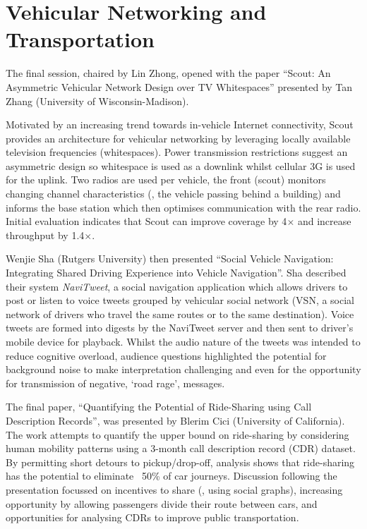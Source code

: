 \section{Vehicular Networking and Transportation}
\label{sec:vehiclenets}
The final session, chaired by Lin Zhong, opened with the paper ``Scout: An 
Asymmetric Vehicular Network Design over TV Whitespaces'' presented by Tan Zhang 
(University of Wisconsin-Madison).

Motivated by an increasing trend towards in-vehicle Internet connectivity, Scout 
provides an architecture for vehicular networking by leveraging locally available 
television frequencies (whitespaces). Power transmission restrictions suggest an 
asymmetric design so whitespace is used as a downlink whilst cellular 3G is 
used for the uplink. Two radios are used per vehicle, the front (scout) 
monitors changing channel characteristics (\eg{}, the vehicle passing behind a 
building) and informs the base station which then optimises communication with 
the rear radio. Initial evaluation indicates that Scout can improve coverage by 
4$\times$ and increase throughput by 1.4$\times$.

Wenjie Sha (Rutgers University) then presented ``Social Vehicle Navigation: 
Integrating Shared Driving Experience into Vehicle Navigation''. Sha described 
their system \emph{NaviTweet}, a social navigation application which allows drivers 
to post or listen to voice tweets grouped by vehicular social 
network (VSN, a social network of drivers who travel the same routes or to the 
same destination). Voice tweets are formed into digests by the 
NaviTweet server and then sent to driver's mobile device for playback.
Whilst the audio nature of the tweets 
was intended to reduce cognitive overload, audience questions highlighted the 
potential for background noise to make interpretation challenging and even for 
the opportunity for transmission of negative, `road rage', messages.

The final paper, ``Quantifying the Potential of Ride-Sharing using Call 
Description Records'', was presented by Blerim Cici (University of California). 
The work attempts to quantify the upper bound on ride-sharing 
by considering human mobility patterns using a 
3-month call description record (CDR) dataset.
By permitting short detours to pickup\slash drop-off,
analysis shows that ride-sharing has the potential to eliminate ~50\% of car 
journeys. Discussion following the presentation focussed on 
incentives to share (\eg{}, using social graphs), increasing opportunity by 
allowing passengers divide their route between cars, and opportunities for 
analysing CDRs to improve public transportation.
